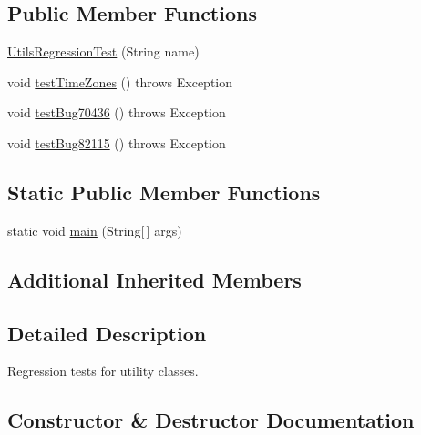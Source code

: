 \subsection*{Public Member Functions}
\begin{DoxyCompactItemize}
\item 
\mbox{\hyperlink{classtestsuite_1_1regression_1_1_utils_regression_test_a5c82c7a08235cbe185d04d950a5d9102}{Utils\+Regression\+Test}} (String name)
\item 
void \mbox{\hyperlink{classtestsuite_1_1regression_1_1_utils_regression_test_a23afa0e1c5288ab757fb3e4c09676f79}{test\+Time\+Zones}} ()  throws Exception 
\item 
void \mbox{\hyperlink{classtestsuite_1_1regression_1_1_utils_regression_test_a29ccb38cafacb3d15f1610080cdc2d8a}{test\+Bug70436}} ()  throws Exception 
\item 
void \mbox{\hyperlink{classtestsuite_1_1regression_1_1_utils_regression_test_a47cc76ff1bb97ee0755b21950e5387d0}{test\+Bug82115}} ()  throws Exception 
\end{DoxyCompactItemize}
\subsection*{Static Public Member Functions}
\begin{DoxyCompactItemize}
\item 
static void \mbox{\hyperlink{classtestsuite_1_1regression_1_1_utils_regression_test_a85edc67e921fc1bae46d247aa21bdfaf}{main}} (String\mbox{[}$\,$\mbox{]} args)
\end{DoxyCompactItemize}
\subsection*{Additional Inherited Members}


\subsection{Detailed Description}
Regression tests for utility classes. 

\subsection{Constructor \& Destructor Documentation}
\mbox{\label{classtestsuite_1_1regression_1_1_utils_regression_test_a5c82c7a08235cbe185d04d950a5d9102}} 

